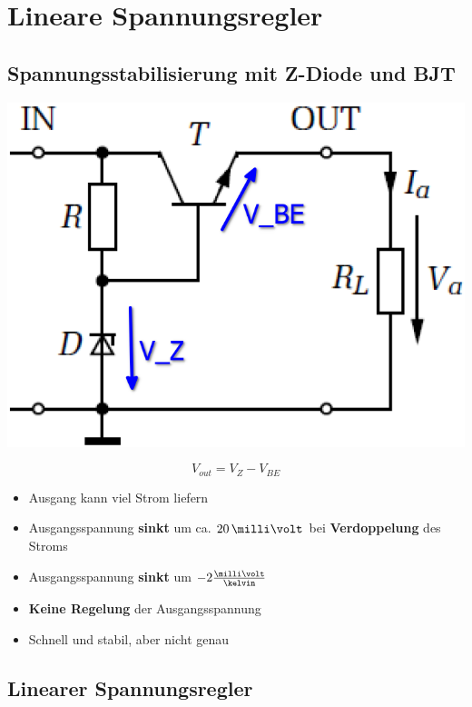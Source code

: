 \section{Lineare Spannungsregler}

\subsection{Spannungsstabilisierung mit Z-Diode und BJT}

\begin{minipage}[c]{0.25\columnwidth}
    \includegraphics[width=\columnwidth]{images/spannungsstabilisierung_z-diode_bjt.png}
\end{minipage}
\hfill
\begin{minipage}[c]{0.72\columnwidth}
    $$ \boxed{ V_{out} = V_Z - V_{BE}} $$
    \begin{itemize}
        \item Ausgang kann viel Strom liefern
        \item Ausgangsspannung \textbf{sinkt} um ca. $20 \, \milli \volt$ bei \textbf{Verdoppelung} des Stroms
        \item Ausgangsspannung \textbf{sinkt} um $- 2 \frac{\milli \volt}{\kelvin}$
        \item \textbf{Keine Regelung} der Ausgangsspannung
        \item Schnell und stabil, aber nicht genau 
    \end{itemize}
\end{minipage}


\subsection{Linearer Spannungsregler}

